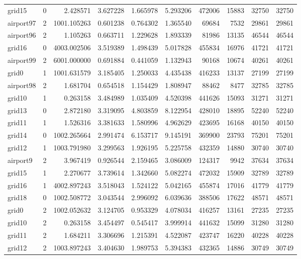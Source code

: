 \begin{longtable}{|l|r|r|r|r|r|r|r|r|r|}
grid15 & 0 & 2.428571 & 3.627228 & 1.665978 & 5.293206 & 472006 & 15883 & 32750 & 32750 \\
airport97 & 2 & 1001.105263 & 0.601238 & 0.764302 & 1.365540 & 69684 & 7532 & 29861 & 29861 \\
airport96 & 2 & 1.105263 & 0.663711 & 1.229628 & 1.893339 & 81986 & 13135 & 46544 & 46544 \\
grid16 & 0 & 4003.002506 & 3.519389 & 1.498439 & 5.017828 & 455834 & 16976 & 41721 & 41721 \\
airport99 & 2 & 6001.000000 & 0.691884 & 0.441059 & 1.132943 & 90168 & 10674 & 40261 & 40261 \\
grid0 & 1 & 1001.631579 & 3.185405 & 1.250033 & 4.435438 & 416233 & 13137 & 27199 & 27199 \\
airport98 & 2 & 1.681704 & 0.654518 & 1.154429 & 1.808947 & 88462 & 8477 & 32785 & 32785 \\
grid10 & 1 & 0.263158 & 3.484989 & 1.035409 & 4.520398 & 441626 & 15093 & 31271 & 31271 \\
grid13 & 0 & 2.872180 & 3.319095 & 4.803859 & 8.122954 & 428010 & 18895 & 52240 & 52240 \\
grid11 & 1 & 1.526316 & 3.381633 & 1.580996 & 4.962629 & 423695 & 16168 & 40150 & 40150 \\
grid14 & 0 & 1002.265664 & 2.991474 & 6.153717 & 9.145191 & 369900 & 23793 & 75201 & 75201 \\
grid12 & 1 & 1003.791980 & 3.299563 & 1.926195 & 5.225758 & 432359 & 14880 & 30740 & 30740 \\
airport9 & 2 & 3.967419 & 0.926544 & 2.159465 & 3.086009 & 124317 & 9942 & 37634 & 37634 \\
grid15 & 1 & 2.270677 & 3.739614 & 1.342660 & 5.082274 & 472032 & 15909 & 32789 & 32789 \\
grid16 & 1 & 4002.897243 & 3.518043 & 1.524122 & 5.042165 & 455874 & 17016 & 41779 & 41779 \\
grid18 & 0 & 1002.508772 & 3.043544 & 2.996092 & 6.039636 & 388506 & 17622 & 48571 & 48571 \\
grid0 & 2 & 1002.052632 & 3.124705 & 0.953329 & 4.078034 & 416257 & 13161 & 27235 & 27235 \\
grid10 & 2 & 0.263158 & 3.454497 & 0.545417 & 3.999914 & 441632 & 15099 & 31280 & 31280 \\
grid11 & 2 & 1.684211 & 3.306696 & 1.215391 & 4.522087 & 423747 & 16220 & 40228 & 40228 \\
grid12 & 2 & 1003.897243 & 3.404630 & 1.989753 & 5.394383 & 432365 & 14886 & 30749 & 30749 \\

\end{longtable}
